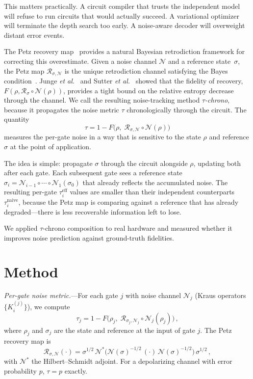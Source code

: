 \documentclass[prl,twocolumn,superscriptaddress,longbibliography]{revtex4-2}
\newcommand{\Petz}{\mathcal{R}}
\newcommand{\chan}{\mathcal{N}}
\begin{document}
This matters practically. A circuit compiler that trusts the independent model will refuse to run circuits that would actually succeed. A variational optimizer will terminate the depth search too early. A noise-aware decoder will overweight distant error events.

The Petz recovery map~\cite{Petz1986} provides a natural Bayesian retrodiction framework for correcting this overestimate. Given a noise channel $\chan$ and a reference state~$\sigma$, the Petz map $\Petz_{\sigma,\chan}$ is the unique retrodiction channel satisfying the Bayes condition~\cite{Parzygnat2023}. Junge \emph{et al.}~\cite{Junge2018} and Sutter \emph{et al.}~\cite{Sutter2016} showed that the fidelity of recovery, $F(\rho, \Petz_\sigma \circ \chan(\rho))$, provides a tight bound on the relative entropy decrease through the channel. We call the resulting noise-tracking method \emph{$\tau$-chrono}, because it propagates the noise metric $\tau$ chronologically through the circuit. The quantity
\begin{equation}\label{eq:tau}
  \tau = 1 - F\bigl(\rho,\; \Petz_{\sigma,\chan} \circ \chan(\rho)\bigr)
\end{equation}
measures the per-gate noise in a way that is sensitive to the state $\rho$ and reference $\sigma$ at the point of application.

The idea is simple: propagate $\sigma$ through the circuit alongside $\rho$, updating both after each gate. Each subsequent gate sees a reference state $\sigma_i = \chan_{i-1} \circ \cdots \circ \chan_1(\sigma_0)$ that already reflects the accumulated noise. The resulting per-gate $\tau_i^{\text{eff}}$ values are smaller than their independent counterparts $\tau_i^{\text{naive}}$, because the Petz map is comparing against a reference that has already degraded---there is less recoverable information left to lose.

We applied $\tau$-chrono composition to real hardware and measured whether it improves noise prediction against ground-truth fidelities.

\section{Method}

\emph{Per-gate noise metric.}---For each gate $j$ with noise channel $\chan_j$ (Kraus operators $\{K_i^{(j)}\}$), we compute
\begin{equation}\label{eq:tau_gate}
  \tau_j = 1 - F\bigl(\rho_j,\; \Petz_{\sigma_j,\chan_j} \circ \chan_j(\rho_j)\bigr)\,,
\end{equation}
where $\rho_j$ and $\sigma_j$ are the state and reference at the input of gate $j$. The Petz recovery map is
\begin{equation}\label{eq:petz}
  \Petz_{\sigma,\chan}(\cdot) = \sigma^{1/2}\,\chan^*\!\bigl(\chan(\sigma)^{-1/2}\,(\cdot)\,\chan(\sigma)^{-1/2}\bigr)\,\sigma^{1/2}\,,
\end{equation}
with $\chan^*$ the Hilbert--Schmidt adjoint. For a depolarizing channel with error probability $p$, $\tau = p$ exactly.
\end{document}
